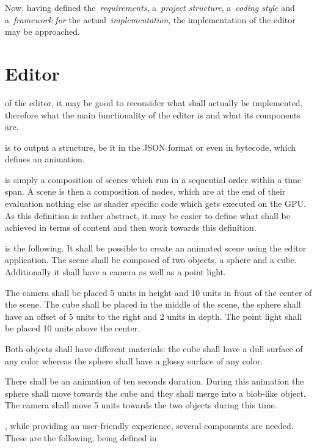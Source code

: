 \documentclass[%
    a4paper,    %
    justified,  %
    nobib,      %
    openany     %
]{tufte-book}
\makeatletter
\renewcommand{\label}[1]{\@tufte@label{##1}}%
\makeatother
\begin{document}
Now, having defined the~\emph{requirements}, a~\emph{project structure},
a~\emph{coding style} and a~\emph{framework for} the
actual~\emph{implementation}, the implementation of the editor may be
approached.

\chapter{Editor}
\label{appendix:chap:editor}

 of the editor, it may
be good to reconsider what shall actually be implemented, therefore what the
main functionality of the editor is and what its components are.

 is to output a structure, be it in
the JSON format or even in bytecode, which defines an animation.

 is simply a composition of scenes which run in a
sequential order within a time span. A scene is then a composition of nodes,
which are at the end of their evaluation nothing else as shader specific code
which gets executed on the GPU. As this definition is rather abstract, it may be
easier to define what shall be achieved in terms of content and then work
towards this definition.

 is the following.
It shall be possible to create an animated scene using the editor application.
The scene shall be composed of two objects, a sphere and a cube. Additionally it
shall have a camera as well as a point light.

The camera shall be placed 5 units in height and 10 units in front of the center
of the scene. The cube shall be placed in the middle of the scene, the sphere
shall have an offset of 5 units to the right and 2 units in depth. The point
light shall be placed 10 units above the center.

Both objects shall have different materials: the cube shall have a dull surface
of any color whereas the sphere shall have a glossy surface of any color.

There shall be an animation of ten seconds duration. During this animation the
sphere shall move towards the cube and they shall merge into a blob-like object.
The camera shall move 5 units towards the two objects during this time.

, while providing an user-friendly
experience, several components are needed. These are the following, being
defined in~~\cite{osterwalder-qde-2016}
\end{document}
